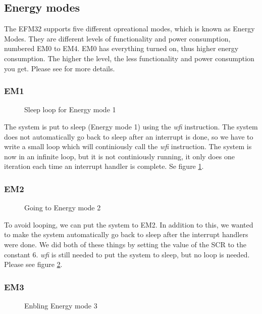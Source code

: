 	\subsection{Energy modes}
	The EFM32 supports five different opreational modes, which is known as Energy Modes. They are different levels of functionality and power consumption, numbered EM0 to EM4. EM0 has everything turned on, thus higher energy consumption. The higher the level, the less functionality and power consumption you get. Please see \cite[p. 2]{energy_optimization_application_note} for more details. 

	\subsubsection{EM1}
	\label{subsubsection:em1}

	\begin{figure}[t]
		
		\caption{Sleep loop for Energy mode 1}
		\label{code:em1}
	\end{figure}
	The system is put to sleep (Energy mode 1) using the \emph{wfi} instruction. The system does not automatically go back to sleep after an interrupt is done, so we have to write a small loop which will continiously call the \emph{wfi} instruction. The system is now in an infinite loop, but it is not continiously running, it only does one iteration each time an interrupt handler is complete. Se figure \ref{code:em1}.

	\subsubsection{EM2}
	\label{subsubsection:em2}
	
	\begin{figure}[t]
		
		\caption{Going to Energy mode 2}
		\label{code:wfi_scr}
	\end{figure}

	To avoid looping, we can put the system to EM2. In addition to this, we  wanted to make the system automatically go back to sleep after the interrupt handlers were done. We did both of these things by setting the value of the SCR to the constant $6$. \emph{wfi} is still needed to put the system to sleep, but no loop is needed. Please see figure \ref{code:wfi_scr}.

		\subsubsection{EM3}
		\label{subsubsection:em3}	
		\begin{figure}[t]
			
			\caption{Enbling Energy mode 3}
			\label{code:em3}
		\end{figure}

